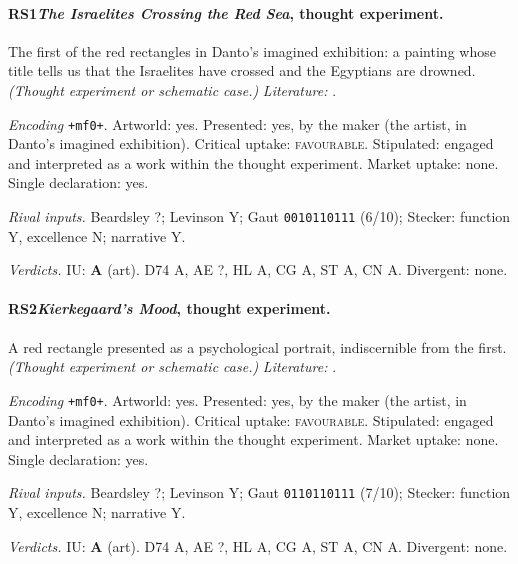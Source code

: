 \paragraph{RS1\enspace \emph{The Israelites Crossing the Red Sea}, thought experiment.}
The first of the red rectangles in Danto's imagined exhibition: a painting whose title tells us that the Israelites have crossed and the Egyptians are drowned. \textit{(Thought experiment or schematic case.)} \textit{Literature:} \citet{Danto1981}.\par
\noindent\textit{Encoding} \texttt{+mf0+}. Artworld: yes. Presented: yes, by the maker (the artist, in Danto's imagined exhibition). Critical uptake: \textsc{favourable}. Stipulated: engaged and interpreted as a work within the thought experiment. Market uptake: none. Single declaration: yes.\par
\noindent\textit{Rival inputs.} Beardsley ?; Levinson Y; Gaut \texttt{0010110111} (6/10); Stecker: function Y, excellence N; narrative Y.\par
\noindent\textit{Verdicts.} IU: \textbf{A} (art). D74 A, AE ?, HL A, CG A, ST A, CN A. Divergent: none.\par

\paragraph{RS2\enspace \emph{Kierkegaard's Mood}, thought experiment.}
A red rectangle presented as a psychological portrait, indiscernible from the first. \textit{(Thought experiment or schematic case.)} \textit{Literature:} \citet{Danto1981}.\par
\noindent\textit{Encoding} \texttt{+mf0+}. Artworld: yes. Presented: yes, by the maker (the artist, in Danto's imagined exhibition). Critical uptake: \textsc{favourable}. Stipulated: engaged and interpreted as a work within the thought experiment. Market uptake: none. Single declaration: yes.\par
\noindent\textit{Rival inputs.} Beardsley ?; Levinson Y; Gaut \texttt{0110110111} (7/10); Stecker: function Y, excellence N; narrative Y.\par
\noindent\textit{Verdicts.} IU: \textbf{A} (art). D74 A, AE ?, HL A, CG A, ST A, CN A. Divergent: none.\par

